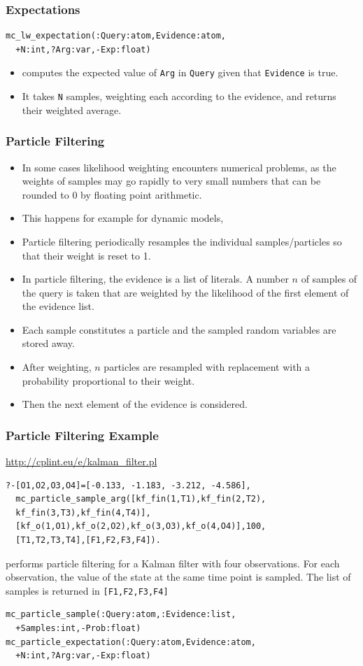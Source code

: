 \documentclass[trans]{beamer}
\begin{document}
\begin{frame}[fragile]
  \frametitle{Expectations}
\begin{verbatim}
mc_lw_expectation(:Query:atom,Evidence:atom,
  +N:int,?Arg:var,-Exp:float)
\end{verbatim}
 \begin{itemize}
\item computes the expected value of \verb|Arg| in \verb|Query| given that \verb|Evidence| is true.
\item  It takes \verb|N| samples, weighting each according to the evidence, and returns their weighted average.
\end{itemize}
\end{frame}
\begin{frame}[fragile]
  \frametitle{Particle Filtering}
  \begin{itemize}
\item In some cases  likelihood weighting encounters numerical  problems,
as the weights of samples may go rapidly to very small numbers that can be rounded to
0 by floating point arithmetic. 
\item This happens for example for dynamic models, 
\item \alert{Particle filtering}  periodically resamples the individual samples/particles so that their weight 
is reset to 1.
\item 
In particle filtering, the evidence is a list of literals. A number $n$ of  samples of the query is taken
that are weighted by the likelihood of the first element of the evidence list. 
\item Each sample constitutes a particle and the sampled random variables are stored away. 
\item 
After weighting, $n$ particles are resampled
with replacement with a probability proportional to their weight.
\item Then the next element of the evidence is considered. 
\end{itemize}
\end{frame}
\begin{frame}[fragile]
  \frametitle{Particle Filtering Example}
\url{http://cplint.eu/e/kalman_filter.pl}
\begin{verbatim}
?-[O1,O2,O3,O4]=[-0.133, -1.183, -3.212, -4.586],
  mc_particle_sample_arg([kf_fin(1,T1),kf_fin(2,T2),
  kf_fin(3,T3),kf_fin(4,T4)],
  [kf_o(1,O1),kf_o(2,O2),kf_o(3,O3),kf_o(4,O4)],100,
  [T1,T2,T3,T4],[F1,F2,F3,F4]).
\end{verbatim}
performs particle filtering for a Kalman filter with four observations. For each observation, the value of the state at the same time point is sampled. The list of samples is returned in \verb|[F1,F2,F3,F4]|
\begin{verbatim}
mc_particle_sample(:Query:atom,:Evidence:list,
  +Samples:int,-Prob:float) 
mc_particle_expectation(:Query:atom,Evidence:atom,
  +N:int,?Arg:var,-Exp:float)
\end{verbatim}
\end{frame}
\end{document}
